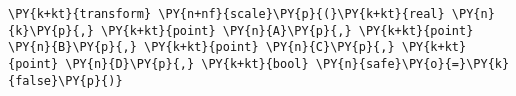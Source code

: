 \begin{Verbatim}[commandchars=\\\{\}]
    \PY{k+kt}{transform} \PY{n+nf}{scale}\PY{p}{(}\PY{k+kt}{real} \PY{n}{k}\PY{p}{,} \PY{k+kt}{point} \PY{n}{A}\PY{p}{,} \PY{k+kt}{point} \PY{n}{B}\PY{p}{,} \PY{k+kt}{point} \PY{n}{C}\PY{p}{,} \PY{k+kt}{point} \PY{n}{D}\PY{p}{,} \PY{k+kt}{bool} \PY{n}{safe}\PY{o}{=}\PY{k}{false}\PY{p}{)}
\end{Verbatim}
